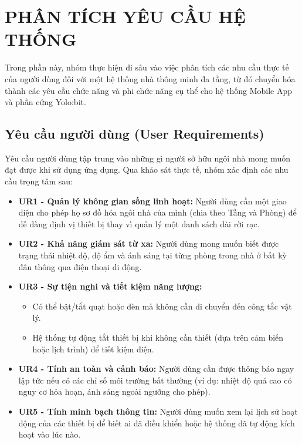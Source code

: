 \section{PHÂN TÍCH YÊU CẦU HỆ THỐNG}

Trong phần này, nhóm thực hiện đi sâu vào việc phân tích các nhu cầu thực tế của người dùng đối với một hệ thống nhà thông minh đa tầng, từ đó chuyển hóa thành các yêu cầu chức năng và phi chức năng cụ thể cho hệ thống Mobile App và phần cứng Yolo:bit.

\subsection{Yêu cầu người dùng (User Requirements)}

Yêu cầu người dùng tập trung vào những gì người sở hữu ngôi nhà mong muốn đạt được khi sử dụng ứng dụng. Qua khảo sát thực tế, nhóm xác định các nhu cầu trọng tâm sau:

\begin{itemize}
    \item \textbf{UR1 - Quản lý không gian sống linh hoạt:} Người dùng cần một giao diện cho phép họ sơ đồ hóa ngôi nhà của mình (chia theo Tầng và Phòng) để dễ dàng định vị thiết bị thay vì quản lý một danh sách dài rời rạc.
    \item \textbf{UR2 - Khả năng giám sát từ xa:} Người dùng mong muốn biết được trạng thái nhiệt độ, độ ẩm và ánh sáng tại từng phòng trong nhà ở bất kỳ đâu thông qua điện thoại di động.
    \item \textbf{UR3 - Sự tiện nghi và tiết kiệm năng lượng:}
    \begin{itemize}
        \item Có thể bật/tắt quạt hoặc đèn mà không cần di chuyển đến công tắc vật lý.
        \item Hệ thống tự động tắt thiết bị khi không cần thiết (dựa trên cảm biến hoặc lịch trình) để tiết kiệm điện.
    \end{itemize}
    \item \textbf{UR4 - Tính an toàn và cảnh báo:} Người dùng cần được thông báo ngay lập tức nếu có các chỉ số môi trường bất thường (ví dụ: nhiệt độ quá cao có nguy cơ hỏa hoạn, ánh sáng ngoài ngưỡng cho phép).
    \item \textbf{UR5 - Tính minh bạch thông tin:} Người dùng muốn xem lại lịch sử hoạt động của các thiết bị để biết ai đã điều khiển hoặc hệ thống đã tự động kích hoạt vào lúc nào.
\end{itemize}


